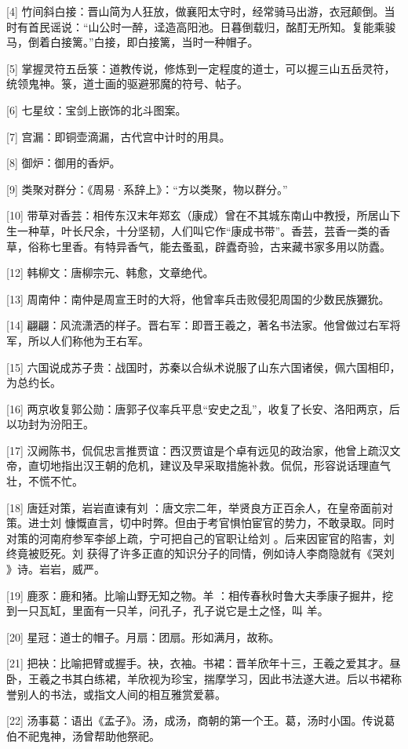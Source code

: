 \documentclass[12pt,UTF8]{ctexbook}
\begin{document}
[4] 竹间斜白接：晋山简为人狂放，做襄阳太守时，经常骑马出游，衣冠颠倒。当时有首民谣说：“山公时一醉，迳造高阳池。日暮倒载归，酩酊无所知。复能乘骏马，倒着白接篱。”白接，即白接篱，当时一种帽子。

[5] 掌握灵符五岳箓：道教传说，修炼到一定程度的道士，可以握三山五岳灵符，统领鬼神。箓，道士画的驱避邪魔的符号、帖子。

[6] 七星纹：宝剑上嵌饰的北斗图案。

[7] 宫漏：即铜壶滴漏，古代宫中计时的用具。

[8] 御炉：御用的香炉。

[9] 类聚对群分：《周易·系辞上》：“方以类聚，物以群分。”

[10] 带草对香芸：相传东汉末年郑玄（康成）曾在不其城东南山中教授，所居山下生一种草，叶长尺余，十分坚韧，人们叫它作“康成书带”。香芸，芸香一类的香草，俗称七里香。有特异香气，能去蚤虱，辟蠹奇验，古来藏书家多用以防蠹。

[12] 韩柳文：唐柳宗元、韩愈，文章绝代。

[13] 周南仲：南仲是周宣王时的大将，他曾率兵击败侵犯周国的少数民族玁狁。

[14] 翩翩：风流潇洒的样子。晋右军：即晋王羲之，著名书法家。他曾做过右军将军，所以人们称他为王右军。

[15] 六国说成苏子贵：战国时，苏秦以合纵术说服了山东六国诸侯，佩六国相印，为总约长。

[16] 两京收复郭公勋：唐郭子仪率兵平息“安史之乱”，收复了长安、洛阳两京，后以功封为汾阳王。

[17] 汉阙陈书，侃侃忠言推贾谊：西汉贾谊是个卓有远见的政治家，他曾上疏汉文帝，直切地指出汉王朝的危机，建议及早采取措施补救。侃侃，形容说话理直气壮，不慌不忙。

[18] 唐廷对策，岩岩直谏有刘 ：唐文宗二年，举贤良方正百余人，在皇帝面前对策。进士刘 慷慨直言，切中时弊。但由于考官惧怕宦官的势力，不敢录取。同时对策的河南府参军李邰上疏，宁可把自己的官职让给刘 。后来因宦官的陷害，刘 终竟被贬死。刘 获得了许多正直的知识分子的同情，例如诗人李商隐就有《哭刘 》诗。岩岩，威严。

[19] 鹿豕：鹿和猪。比喻山野无知之物。羊 ：相传春秋时鲁大夫季康子掘井，挖到一只瓦缸，里面有一只羊，问孔子，孔子说它是土之怪，叫 羊。

[20] 星冠：道士的帽子。月扇：团扇。形如满月，故称。

[21] 把袂：比喻把臂或握手。袂，衣袖。书裙：晋羊欣年十三，王羲之爱其才。昼卧，王羲之书其白练裙，羊欣视为珍宝，揣摩学习，因此书法遂大进。后以书裙称誉别人的书法，或指文人间的相互雅赏爱慕。

[22] 汤事葛：语出《孟子》。汤，成汤，商朝的第一个王。葛，汤时小国。传说葛伯不祀鬼神，汤曾帮助他祭祀。
\end{document}
